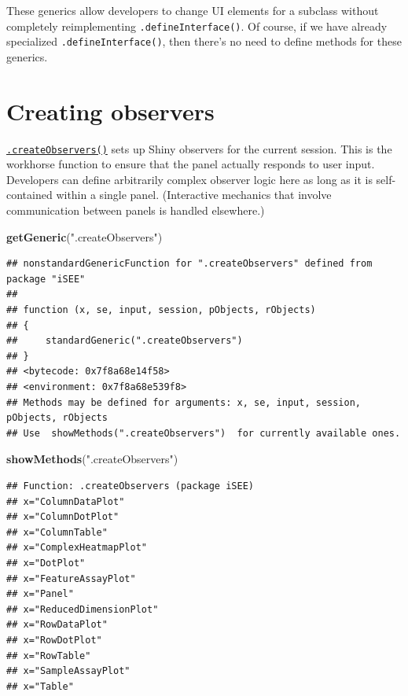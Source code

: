 \documentclass[
]{book}
\newenvironment{Shaded}{\begin{snugshade}}{\end{snugshade}}
\newcommand{\KeywordTok}[1]{\textcolor[rgb]{0.13,0.29,0.53}{\textbf{#1}}}
\newcommand{\NormalTok}[1]{#1}
\newcommand{\StringTok}[1]{\textcolor[rgb]{0.31,0.60,0.02}{#1}}
\begin{document}
These generics allow developers to change UI elements for a subclass without completely reimplementing \texttt{.defineInterface()}.
Of course, if we have already specialized \texttt{.defineInterface()}, then there's no need to define methods for these generics.

\hypertarget{creating-observers}{%
\section{Creating observers}\label{creating-observers}}

\href{https://isee.github.io/iSEE/reference/observer-generics.html}{\texttt{.createObservers()}} sets up Shiny observers for the current session.
This is the workhorse function to ensure that the panel actually responds to user input.
Developers can define arbitrarily complex observer logic here as long as it is self-contained within a single panel.
(Interactive mechanics that involve communication between panels is handled elsewhere.)

\begin{Shaded}
\begin{Highlighting}[]
\KeywordTok{getGeneric}\NormalTok{(}\StringTok{".createObservers"}\NormalTok{)}
\end{Highlighting}
\end{Shaded}

\begin{verbatim}
## nonstandardGenericFunction for ".createObservers" defined from package "iSEE"
## 
## function (x, se, input, session, pObjects, rObjects) 
## {
##     standardGeneric(".createObservers")
## }
## <bytecode: 0x7f8a68e14f58>
## <environment: 0x7f8a68e539f8>
## Methods may be defined for arguments: x, se, input, session, pObjects, rObjects
## Use  showMethods(".createObservers")  for currently available ones.
\end{verbatim}

\begin{Shaded}
\begin{Highlighting}[]
\KeywordTok{showMethods}\NormalTok{(}\StringTok{".createObservers"}\NormalTok{)}
\end{Highlighting}
\end{Shaded}

\begin{verbatim}
## Function: .createObservers (package iSEE)
## x="ColumnDataPlot"
## x="ColumnDotPlot"
## x="ColumnTable"
## x="ComplexHeatmapPlot"
## x="DotPlot"
## x="FeatureAssayPlot"
## x="Panel"
## x="ReducedDimensionPlot"
## x="RowDataPlot"
## x="RowDotPlot"
## x="RowTable"
## x="SampleAssayPlot"
## x="Table"
\end{verbatim}
\end{document}

